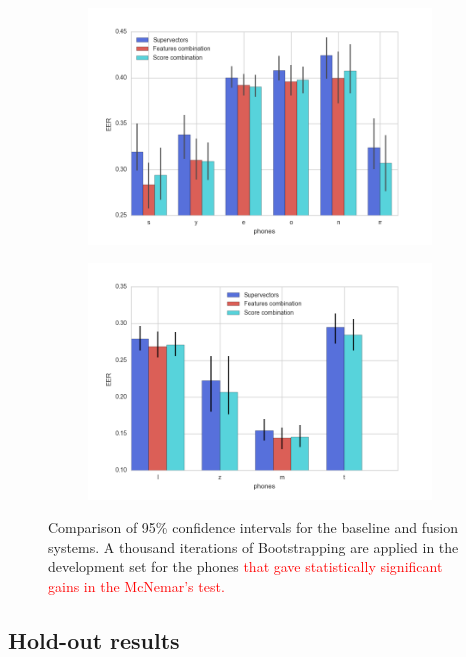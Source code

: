 \begin{figure}[H]
  \centering
  \begin{subfigure}{.47\textwidth}
    \centering
    \captionsetup{width=.95\linewidth}
    \includegraphics[width=1.08\linewidth, height=0.225\textheight]{files/figures/results/bootstrapping/bootstrapping_dev_2}
  \end{subfigure}
  \begin{subfigure}{.47\textwidth}
    \centering
    \captionsetup{width=.95\linewidth}
    \includegraphics[width=.72\linewidth, height=0.225\textheight]{files/figures/results/bootstrapping/bootstrapping_dev_1}
  \end{subfigure}
  \caption{Comparison of 95\% confidence intervals for the baseline and fusion systems.
  A thousand iterations of Bootstrapping are applied
  in the development set for the phones \textcolor{red}{that gave statistically significant gains in the
  McNemar's test.}}
  \label{fig:bootstrappingDev}
\end{figure}

\subsection{Hold-out results}

